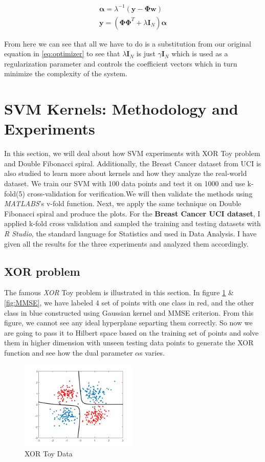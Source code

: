 \documentclass[conference]{IEEEtran}
\begin{document}
\begin{align*}
\bm{\alpha} = \lambda^{-1}(\mathbf{y} - \mathbf{\Phi} \mathbf{w}) \\
\mathbf{y} = (\mathbf{\Phi \Phi}^T + \lambda\mathbf{I}_N)\mathbf{\alpha}
\end{align*}

From here we can see that all we have to do is a substitution from our original equation in \ref{eq:optimizer} to see that
$\lambda\bm{I}_N$ is just $\gamma\bm{I}_N$ which is used as a regularization parameter and controls the coefficient vectors which in turn minimize the complexity 
of the system. 

\section{SVM Kernels: Methodology and Experiments}
In this section, we will deal about how SVM experiments with XOR Toy problem and Double Fibonacci spiral. Additionally, the Breast Cancer dataset from UCI is also studied to learn more about kernels and how they analyze the real-world dataset. We train our SVM with 100 data points and test it on 1000 and use k-fold(5) cross-validation for verification.We will then validate the methods using \textit{MATLABS}'s v-fold function. Next, we apply the same technique on Double Fibonacci spiral and produce the plots. For the \textbf{Breast Cancer UCI dataset}, I applied k-fold cross validation and sampled the training and testing datasets with \textit{R Studio}, the standard language for Statistics and used in Data Analysis. I have given all the results for the three experiments and analyzed them accordingly.

\subsection{XOR problem}
The famous \textit{XOR} Toy problem is illustrated in this section. In figure 
\ref{fig:XOR} \& \ref{fig:MMSE}, we have labeled 4 set of points with one class in red, and the other class in blue constructed using Gaussian kernel and MMSE criterion. From this figure, we cannot see any ideal hyperplane separting them correctly. So now we are going to pass it to Hilbert space based on the training set of points and solve them in higher dimension with unseen testing data points to generate the XOR function and see how the dual parameter $\alpha$s varies.  

\begin{figure}[ht!]
\centering
\includegraphics[width=0.5\textwidth]{figs/XOR.png}
\caption{XOR Toy Data}
\label{fig:XOR} 
\end{figure}
\end{document}
